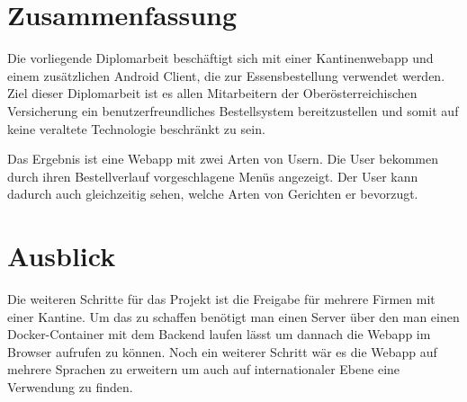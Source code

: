 \section{Zusammenfassung}
\author{Bozidar Spasenovic}
Die vorliegende Diplomarbeit beschäftigt sich mit einer Kantinenwebapp und einem zusätzlichen Android Client, die zur Essensbestellung
verwendet werden. Ziel dieser Diplomarbeit ist es allen Mitarbeitern der Oberösterreichischen Versicherung ein benutzerfreundliches Bestellsystem
bereitzustellen und somit auf keine veraltete Technologie beschränkt zu sein. 

Das Ergebnis ist eine Webapp mit zwei Arten von Usern. Die User bekommen durch ihren Bestellverlauf vorgeschlagene
Menüs angezeigt. Der User kann dadurch auch gleichzeitig sehen, welche Arten von Gerichten er bevorzugt.

\section{Ausblick}
Die weiteren Schritte für das Projekt ist die Freigabe für mehrere Firmen mit einer Kantine. Um das zu schaffen benötigt man einen Server
über den man einen Docker-Container mit dem Backend laufen lässt um dannach die Webapp im Browser aufrufen zu können. Noch ein
weiterer Schritt wär es die Webapp auf mehrere Sprachen zu erweitern um auch auf internationaler Ebene eine Verwendung zu finden.
